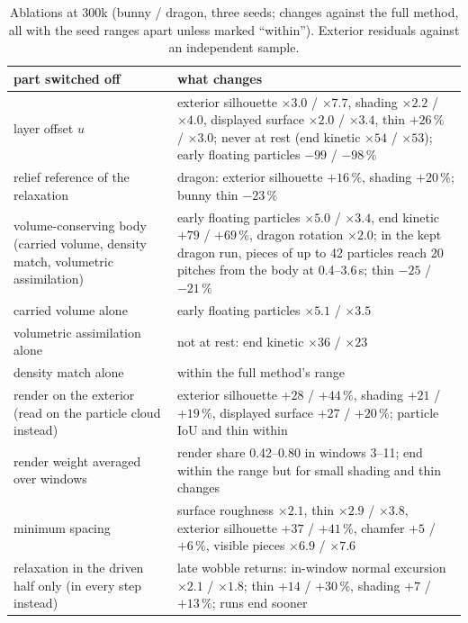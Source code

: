 \begin{table}[t]
\centering
\footnotesize
\setlength{\tabcolsep}{4pt}
\caption{Ablations at 300k (bunny / dragon, three seeds; changes against the full method, all with the seed ranges
apart unless marked ``within''). Exterior residuals against an independent sample.}
\label{ch4:tab_ablation}
\begin{tabular}{p{3.6cm}p{9.8cm}}
\toprule
part switched off & what changes \\
\midrule
layer offset $u$ & exterior silhouette $\times3.0$ / $\times7.7$, shading $\times2.2$ / $\times4.0$, displayed surface
  $\times2.0$ / $\times3.4$, thin $+26\,\%$ / $\times3.0$; never at rest (end kinetic $\times54$ / $\times53$); early
  floating particles $-99$ / $-98\,\%$ \\
relief reference of the relaxation & dragon: exterior silhouette $+16\,\%$, shading $+20\,\%$; bunny thin $-23\,\%$ \\
volume-conserving body (carried volume, density match, volumetric assimilation) & early floating particles $\times5.0$ /
  $\times3.4$, end kinetic $+79$ / $+69\,\%$, dragon rotation $\times2.0$; in the kept dragon run, pieces of up to 42
  particles reach 20 pitches from the body at 0.4--3.6\,s; thin $-25$ / $-21\,\%$ \\
\quad carried volume alone & early floating particles $\times5.1$ / $\times3.5$ \\
\quad volumetric assimilation alone & not at rest: end kinetic $\times36$ / $\times23$ \\
\quad density match alone & within the full method's range \\
render on the exterior (read on the particle cloud instead) & exterior silhouette $+28$ / $+44\,\%$, shading $+21$ /
  $+19\,\%$, displayed surface $+27$ / $+20\,\%$; particle IoU and thin within \\
render weight averaged over windows & render share 0.42--0.80 in windows 3--11; end within the range but for small
  shading and thin changes \\
minimum spacing & surface roughness $\times2.1$, thin $\times2.9$ / $\times3.8$, exterior silhouette $+37$ / $+41\,\%$,
  chamfer $+5$ / $+6\,\%$, visible pieces $\times6.9$ / $\times7.6$ \\
relaxation in the driven half only (in every step instead) & late wobble returns: in-window normal excursion
  $\times2.1$ / $\times1.8$; thin $+14$ / $+30\,\%$, shading $+7$ / $+13\,\%$; runs end sooner \\

\end{tabular}
\end{table}
